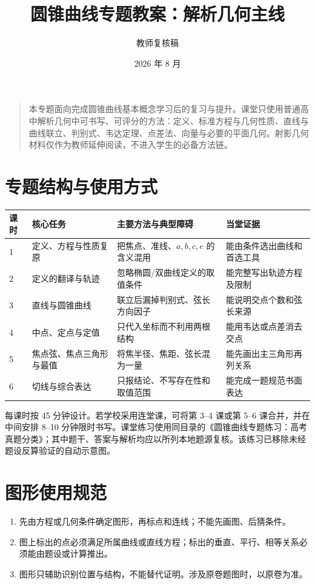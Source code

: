 \documentclass[UTF8,a4paper,11pt]{ctexart}
\title{圆锥曲线专题教案：解析几何主线}
\author{教师复核稿}
\date{2026 年 8 月}
\begin{document}
\maketitle

\begin{quote}
本专题面向完成圆锥曲线基本概念学习后的复习与提升。课堂只使用普通高中解析几何中可书写、可评分的方法：定义、标准方程与几何性质、直线与曲线联立、判别式、韦达定理、点差法、向量与必要的平面几何。射影几何材料仅作为教师延伸阅读，不进入学生的必备方法链。
\end{quote}

\section*{专题结构与使用方式}
\begin{longtable}{p{}p{}p{}p{}}
\toprule
课时 & 核心任务 & 主要方法与典型障碍 & 当堂证据 \\
\midrule
1 & 定义、方程与性质复原 & 把焦点、准线、$a,b,c,e$ 的含义混用 & 能由条件选出曲线和首选工具 \\
2 & 定义的翻译与轨迹 & 忽略椭圆/双曲线定义的取值条件 & 能完整写出轨迹方程及限制 \\
3 & 直线与圆锥曲线 & 联立后漏掉判别式、弦长方向因子 & 能说明交点个数和弦长来源 \\
4 & 中点、定点与定值 & 只代入坐标而不利用两根结构 & 能用韦达或点差消去交点 \\
5 & 焦点弦、焦点三角形与最值 & 将焦半径、焦距、弦长混为一量 & 能先画出主三角形再列关系 \\
6 & 切线与综合表达 & 只报结论、不写存在性和取值范围 & 能完成一题规范书面表达 \\
\bottomrule
\end{longtable}

每课时按 45 分钟设计。若学校采用连堂课，可将第 3--4 课或第 5--6 课合并，并在中间安排 8--10 分钟限时书写。课堂练习使用同目录的《圆锥曲线专题练习：高考真题分类》；其中题干、答案与解析均应以所列本地题源复核。该练习已移除未经题设反算验证的自动示意图。

\section*{图形使用规范}
\begin{enumerate}
  \item 先由方程或几何条件确定图形，再标点和连线；不能先画图、后猜条件。
  \item 图上标出的点必须满足所属曲线或直线方程；标出的垂直、平行、相等关系必须能由题设或计算推出。
  \item 图形只辅助识别位置与结构，不能替代证明。涉及原卷题图时，以原卷为准。
\end{enumerate}
\end{document}
